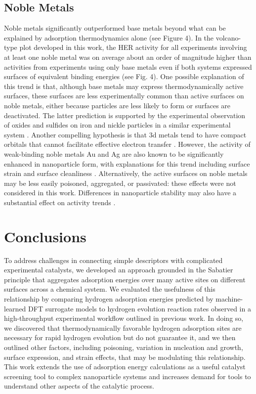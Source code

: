 \documentclass[preprint,12pt]{elsarticle}
\begin{document}
\subsection{Noble Metals}\label{Section:Results/Noble}
Noble metals significantly outperformed base metals beyond what can be explained by adsorption thermodynamics alone (see Figure 4). In the volcano-type plot developed in this work, the HER activity for all experiments involving at least one noble metal was on average about an order of magnitude higher than activities from experiments using only base metals even if both systems expressed surfaces of equivalent binding energies (see Fig. 4). One possible explanation of this trend is that, although base metals may express thermodynamically active surfaces, these surfaces are less experimentally common than active surfaces on noble metals, either because particles are less likely to form or surfaces are deactivated. The latter prediction is supported by the experimental observation of oxides and sulfides on iron and nickle particles in a similar experimental system \cite{bhat2022accelerated}. Another compelling hypothesis is that 3d metals tend to have compact orbitals that cannot facilitate effective electron transfer \cite{quaino2014volcano}. However, the activity of weak-binding noble metals Au and Ag are also known to be significantly enhanced in nanoparticle form, with explanations for this trend including surface strain and surface cleanliness \cite{tran2018gold,campbell2009hydrogen,amin2014situ,merga2010naked,falsig2008trends}. Alternatively, the active surfaces on noble metals may be less easily poisoned, aggregated, or passivated: these effects were not considered in this work. Differences in nanoparticle stability may also have a substantial effect on activity trends \cite{simon2022ligand}.


\section{Conclusions}\label{Section:Conclusions}
To address challenges in connecting simple descriptors with complicated experimental catalysts, we developed an approach grounded in the Sabatier principle that aggregates adsorption energies over many active sites on different surfaces across a chemical system. We evaluated the usefulness of this relationship by comparing hydrogen adsorption energies predicted by machine-learned DFT surrogate models to hydrogen evolution reaction rates observed in a high-throughput experimental workflow outlined in previous work. In doing so, we discovered that thermodynamically favorable hydrogen adsorption sites are necessary for rapid hydrogen evolution but do not guarantee it, and we then outlined other factors, including poisoning, variation in nucleation and growth, surface expression, and strain effects, that may be modulating this relationship. This work extends the use of adsorption energy calculations as a useful catalyst screening tool to complex nanoparticle systems and increases demand for tools to understand other aspects of the catalytic process.
\end{document}
